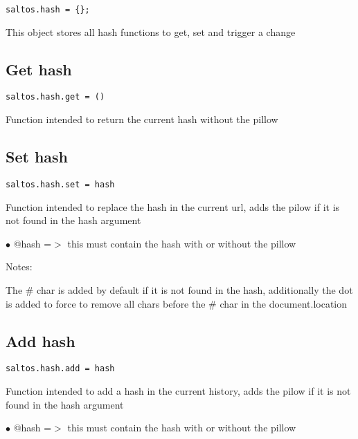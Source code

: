\documentclass[a4paper]{book}
\begin{document}
\begin{lstlisting}
saltos.hash = {};
\end{lstlisting}

This object stores all hash functions to get, set and trigger a change

\hypertarget{toc399}{}
\subsection{Get hash}

\begin{lstlisting}
saltos.hash.get = ()
\end{lstlisting}

Function intended to return the current hash without the pillow

\hypertarget{toc400}{}
\subsection{Set hash}

\begin{lstlisting}
saltos.hash.set = hash
\end{lstlisting}

Function intended to replace the hash in the current url, adds the pilow if it is not found
in the hash argument

\begin{compactitem}
\item[\color{myblue}$\bullet$] @hash =$>$ this must contain the hash with or without the pillow
\end{compactitem}

Notes:

The \# char is added by default if it is not found in the hash, additionally the dot is
added to force to remove all chars before the \# char in the document.location

\hypertarget{toc401}{}
\subsection{Add hash}

\begin{lstlisting}
saltos.hash.add = hash
\end{lstlisting}

Function intended to add a hash in the current history, adds the pilow if it is not found
in the hash argument

\begin{compactitem}
\item[\color{myblue}$\bullet$] @hash =$>$ this must contain the hash with or without the pillow
\end{compactitem}
\end{document}
